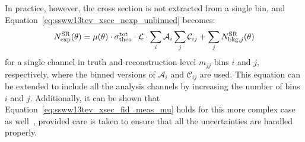 In practice, however, the cross section is not extracted from a single bin, and Equation~\ref{eq:ssww13tev_xsec_nexp_unbinned} becomes:
\begin{equation}
  N_{\textrm{exp}}^{\textrm{SR}}(\theta) = \mu(\theta)\cdot\sigma_{\textrm{theo}}^{\textrm{tot}}\cdot\mathcal{L}\cdot\sum\limits_i\mathcal{A}_i\sum\limits_j\mathcal{C}_{ij}+\sum\limits_j N_{\textrm{bkg},j}^{\textrm{SR}}(\theta)
\end{equation}
for a single channel in truth and reconstruction level $m_{jj}$ bins $i$ and $j$, respectively, where the binned versions of $\mathcal{A}_i$ and $\mathcal{C}_{ij}$ are used.
This equation can be extended to include all the analysis channels by increasing the number of bins $i$ and $j$.
Additionally, it can be shown that Equation~\ref{eq:ssww13tev_xsec_fid_meas_mu} holds for this more complex case as well~\cite{2018.ssww-13tev-atlas-support}, provided care is taken to ensure that all the uncertainties are handled properly.


